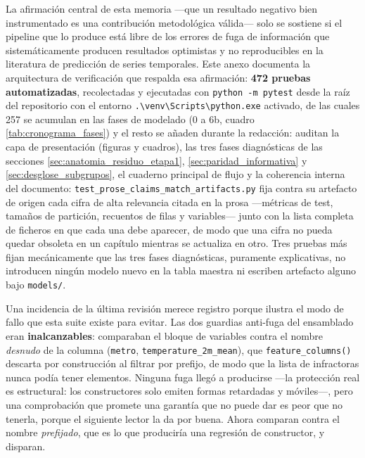 \begin{sloppypar}
La afirmación central de esta memoria —que un resultado negativo bien instrumentado es
una contribución metodológica válida— solo se sostiene si el pipeline que lo produce está
libre de los errores de fuga de información que sistemáticamente producen resultados
optimistas y no reproducibles en la literatura de predicción de series temporales. Este
anexo documenta la arquitectura de verificación que respalda esa afirmación: \textbf{472
pruebas automatizadas}, recolectadas y ejecutadas con \texttt{python -m pytest} desde la
raíz del repositorio con el entorno
\texttt{.\textbackslash venv\textbackslash Scripts\textbackslash python.exe} activado,
de las cuales 257 se acumulan en las fases de modelado (0 a 6b, cuadro
\ref{tab:cronograma_fases}) y el resto se añaden durante la redacción: auditan la capa de
presentación (figuras y cuadros), las tres fases diagnósticas de las secciones
\ref{sec:anatomia_residuo_etapa1}, \ref{sec:paridad_informativa} y
\ref{sec:desglose_subgrupos}, el cuaderno principal de flujo y la coherencia interna del
documento: \texttt{test\_prose\_claims\_match\_artifacts.py} fija contra su artefacto de
origen cada cifra de alta relevancia citada en la prosa —métricas de test, tamaños de
partición, recuentos de filas y variables— junto con la lista completa de ficheros en que
cada una debe aparecer, de modo que una cifra no pueda quedar obsoleta en un capítulo
mientras se actualiza en otro. Tres pruebas más fijan mecánicamente que las tres fases
diagnósticas, puramente explicativas, no introducen ningún modelo nuevo en la tabla
maestra ni escriben artefacto alguno bajo \texttt{models/}.

Una incidencia de la última revisión merece registro porque ilustra el modo de fallo que
esta suite existe para evitar. Las dos guardias anti-fuga del ensamblado eran
\textbf{inalcanzables}: comparaban el bloque de variables contra el nombre \emph{desnudo}
de la columna (\texttt{metro}, \texttt{temperature\_2m\_mean}), que
\texttt{feature\_columns()} descarta por construcción al filtrar por prefijo, de modo que
la lista de infractoras nunca podía tener elementos. Ninguna fuga llegó a producirse —la
protección real es estructural: los constructores solo emiten formas retardadas y
móviles—, pero una comprobación que promete una garantía que no puede dar es peor que no
tenerla, porque el siguiente lector la da por buena. Ahora comparan contra el nombre
\emph{prefijado}, que es lo que produciría una regresión de constructor, y disparan.


\end{sloppypar}
